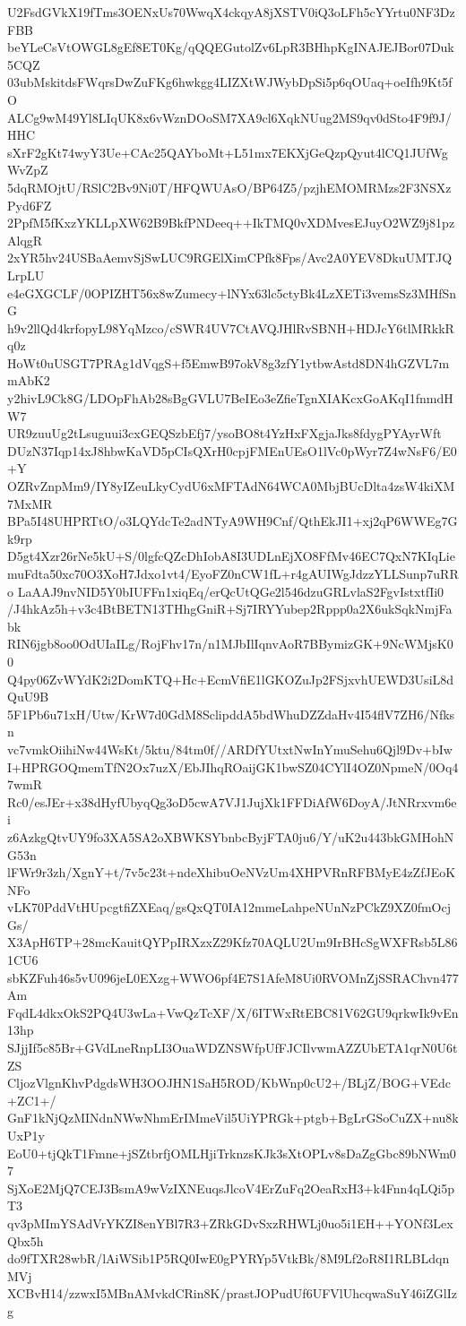 U2FsdGVkX19fTms3OENxUs70WwqX4ckqyA8jXSTV0iQ3oLFh5cYYrtu0NF3DzFBB
beYLeCsVtOWGL8gEf8ET0Kg/qQQEGutolZv6LpR3BHhpKgINAJEJBor07Duk5CQZ
03ubMskitdsFWqrsDwZuFKg6hwkgg4LIZXtWJWybDpSi5p6qOUaq+oeIfh9Kt5fO
ALCg9wM49Yl8LIqUK8x6vWznDOoSM7XA9cl6XqkNUug2MS9qv0dSto4F9f9J/HHC
sXrF2gKt74wyY3Ue+CAc25QAYboMt+L51mx7EKXjGeQzpQyut4lCQ1JUfWgWvZpZ
5dqRMOjtU/RSlC2Bv9Ni0T/HFQWUAsO/BP64Z5/pzjhEMOMRMzs2F3NSXzPyd6FZ
2PpfM5fKxzYKLLpXW62B9BkfPNDeeq++IkTMQ0vXDMvesEJuyO2WZ9j81pzAlqgR
2xYR5hv24USBaAemvSjSwLUC9RGElXimCPfk8Fps/Avc2A0YEV8DkuUMTJQLrpLU
e4eGXGCLF/0OPIZHT56x8wZumecy+lNYx63lc5ctyBk4LzXETi3vemsSz3MHfSnG
h9v2llQd4krfopyL98YqMzco/cSWR4UV7CtAVQJHlRvSBNH+HDJcY6tlMRkkRq0z
HoWt0uUSGT7PRAg1dVqgS+f5EmwB97okV8g3zfY1ytbwAstd8DN4hGZVL7mmAbK2
y2hivL9Ck8G/LDOpFhAb28sBgGVLU7BeIEo3eZfieTgnXIAKcxGoAKqI1fnmdHW7
UR9zuuUg2tLsuguui3cxGEQSzbEfj7/ysoBO8t4YzHxFXgjaJks8fdygPYAyrWft
DUzN37Iqp14xJ8hbwKaVD5pCIsQXrH0cpjFMEnUEsO1lVc0pWyr7Z4wNsF6/E0+Y
OZRvZnpMm9/IY8yIZeuLkyCydU6xMFTAdN64WCA0MbjBUcDlta4zsW4kiXM7MxMR
BPa5I48UHPRTtO/o3LQYdcTe2adNTyA9WH9Cnf/QthEkJI1+xj2qP6WWEg7Gk9rp
D5gt4Xzr26rNe5kU+S/0lgfcQZcDhIobA8I3UDLnEjXO8FfMv46EC7QxN7KIqLie
muFdta50xc70O3XoH7Jdxo1vt4/EyoFZ0nCW1fL+r4gAUIWgJdzzYLLSunp7uRRo
LaAAJ9nvNID5Y0bIUFFn1xiqEq/erQcUtQGe2l546dzuGRLvlaS2FgvIstxtfIi0
/J4hkAz5h+v3c4BtBETN13THhgGniR+Sj7IRYYubep2Rppp0a2X6ukSqkNmjFabk
RIN6jgb8oo0OdUIaILg/RojFhv17n/n1MJbIlIqnvAoR7BBymizGK+9NcWMjsK00
Q4py06ZvWYdK2i2DomKTQ+Hc+EcmVfiE1lGKOZuJp2FSjxvhUEWD3UsiL8dQuU9B
5F1Pb6u71xH/Utw/KrW7d0GdM8SclipddA5bdWhuDZZdaHv4I54flV7ZH6/Nfksn
vc7vmkOiihiNw44WsKt/5ktu/84tm0f//ARDfYUtxtNwInYmuSehu6Qjl9Dv+bIw
I+HPRGOQmemTfN2Ox7uzX/EbJIhqROaijGK1bwSZ04CYlI4OZ0NpmeN/0Oq47wmR
Rc0/esJEr+x38dHyfUbyqQg3oD5cwA7VJ1JujXk1FFDiAfW6DoyA/JtNRrxvm6ei
z6AzkgQtvUY9fo3XA5SA2oXBWKSYbnbcByjFTA0ju6/Y/uK2u443bkGMHohNG53n
lFWr9r3zh/XgnY+t/7v5c23t+ndeXhibuOeNVzUm4XHPVRnRFBMyE4zZfJEoKNFo
vLK70PddVtHUpcgtfiZXEaq/gsQxQT0IA12mmeLahpeNUnNzPCkZ9XZ0fmOcjGs/
X3ApH6TP+28mcKauitQYPpIRXzxZ29Kfz70AQLU2Um9IrBHcSgWXFRsb5L861CU6
sbKZFuh46s5vU096jeL0EXzg+WWO6pf4E7S1AfeM8Ui0RVOMnZjSSRAChvn477Am
FqdL4dkxOkS2PQ4U3wLa+VwQzTcXF/X/6ITWxRtEBC81V62GU9qrkwIk9vEn13hp
SJjjIf5c85Br+GVdLneRnpLI3OuaWDZNSWfpUfFJCIlvwmAZZUbETA1qrN0U6tZS
CljozVlgnKhvPdgdsWH3OOJHN1SaH5ROD/KbWnp0cU2+/BLjZ/BOG+VEdc+ZC1+/
GnF1kNjQzMINdnNWwNhmErIMmeVil5UiYPRGk+ptgb+BgLrGSoCuZX+nu8kUxP1y
EoU0+tjQkT1Fmne+jSZtbrfjOMLHjiTrknzsKJk3sXtOPLv8sDaZgGbc89bNWm07
SjXoE2MjQ7CEJ3BsmA9wVzIXNEuqsJlcoV4ErZuFq2OeaRxH3+k4Fnn4qLQi5pT3
qv3pMImYSAdVrYKZI8enYBl7R3+ZRkGDvSxzRHWLj0uo5i1EH++YONf3LexQbx5h
do9fTXR28wbR/lAiWSib1P5RQ0IwE0gPYRYp5VtkBk/8M9Lf2oR8I1RLBLdqnMVj
XCBvH14/zzwxI5MBnAMvkdCRin8K/prastJOPudUf6UFVlUhcqwaSuY46iZGlIzg
